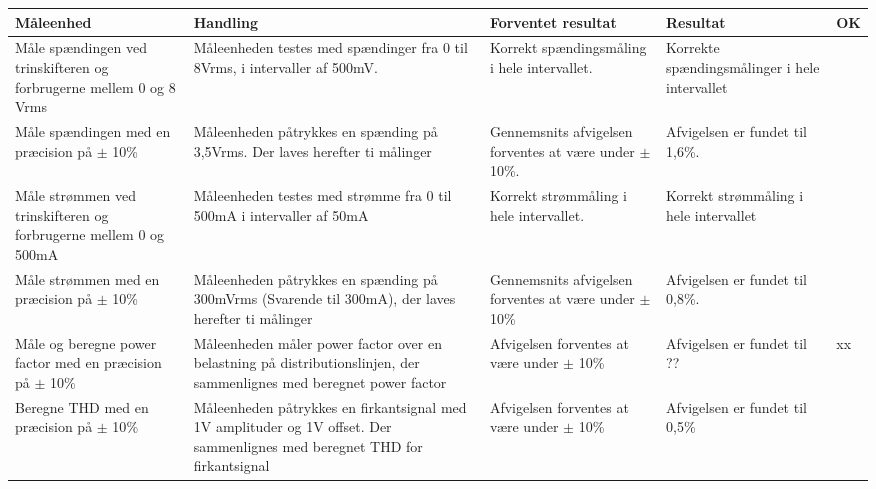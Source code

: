 	\begin{longtable}{|p{4cm}|p{3cm}|p{3cm}|p{3cm}|p{1cm}|}
		\hline
		\textbf{Måleenhed} & \textbf{Handling} & \textbf{Forventet resultat} & \textbf{Resultat} &\textbf{OK} \\\hline
		Måle spændingen ved trinskifteren og forbrugerne mellem 0 og 8 Vrms & Måleenheden testes med spændinger fra 0 til 8Vrms, i intervaller af 500mV. & Korrekt spændingsmåling i hele intervallet. & Korrekte spændingsmålinger i hele intervallet & \checkmark\\\hline
		Måle spændingen med en præcision på $\pm$ 10\%& Måleenheden påtrykkes en spænding på 3,5Vrms. Der laves herefter ti målinger& Gennemsnits afvigelsen forventes at være under $\pm$10\%.& Afvigelsen er fundet til 1,6\%. &\checkmark\\\hline
		Måle strømmen ved trinskifteren og forbrugerne mellem 0 og 500mA& Måleenheden testes med strømme fra 0 til 500mA i intervaller af 50mA&Korrekt strømmåling i hele intervallet.&Korrekt strømmåling i hele intervallet&\checkmark\\\hline
		Måle strømmen med en præcision på $\pm$ 10\%&Måleenheden påtrykkes en spænding på 300mVrms (Svarende til 300mA), der laves herefter ti målinger&Gennemsnits afvigelsen forventes at være under $\pm$10\%&Afvigelsen er fundet til 0,8\%.&\checkmark\\\hline
		Måle og beregne power factor med en præcision på $\pm$ 10$\%$&Måleenheden måler power factor over en belastning på distributionslinjen, der sammenlignes med beregnet power factor&Afvigelsen forventes at være under $\pm$ 10\% &Afvigelsen er fundet til ??&xx\\\hline
		Beregne THD med en præcision på $\pm$ 10$\%$&Måleenheden påtrykkes en firkantsignal med 1V amplituder og 1V offset. Der sammenlignes med beregnet THD for firkantsignal& Afvigelsen forventes at være under $\pm$ 10\%&Afvigelsen er fundet til 0,5\%&\checkmark\\\hline
			
	\end{longtable}
	
	
